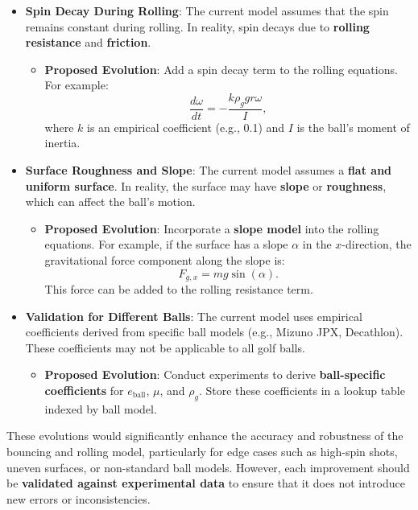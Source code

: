 \documentclass[10pt,a4paper]{report}
\begin{document}
\begin{itemize}
    \item \textbf{Spin Decay During Rolling}:
    The current model assumes that the spin remains constant during rolling. In reality, 
    spin decays due to \textbf{rolling resistance} and \textbf{friction}.
    \begin{itemize}
        \item \textbf{Proposed Evolution}: Add a spin decay term to the rolling equations. For example:
        \[
        \frac{d\omega}{dt} = -\frac{k \rho_g g r \omega}{I},
        \]
        where $k$ is an empirical coefficient (e.g., 0.1) and $I$ is the ball's moment of inertia.
    \end{itemize}

    \item \textbf{Surface Roughness and Slope}:
    The current model assumes a \textbf{flat and uniform surface}. In reality, the surface may 
    have \textbf{slope} or \textbf{roughness}, which can affect the ball's motion.
    \begin{itemize}
        \item \textbf{Proposed Evolution}: Incorporate a \textbf{slope model} into the rolling 
        equations. For example, if the surface has a slope $\alpha$ in the $x$-direction, 
        the gravitational force component along the slope is:
        \[
        F_{g,x} = m g \sin(\alpha).
        \]
        This force can be added to the rolling resistance term.
    \end{itemize}

    \item \textbf{Validation for Different Balls}:
    The current model uses empirical coefficients derived from specific ball models (e.g., Mizuno JPX, Decathlon). 
    These coefficients may not be applicable to all golf balls.
    \begin{itemize}
        \item \textbf{Proposed Evolution}: Conduct experiments to derive \textbf{ball-specific coefficients} 
        for $e_{\text{ball}}$, $\mu$, and $\rho_g$. Store these coefficients in a lookup table indexed by ball model.
    \end{itemize}
\end{itemize}

These evolutions would significantly enhance the accuracy and robustness of the bouncing and rolling model, 
particularly for edge cases such as high-spin shots, uneven surfaces, or non-standard ball models. However, 
each improvement should be \textbf{validated against experimental data} to ensure that it does not introduce 
new errors or inconsistencies.
\end{document}
